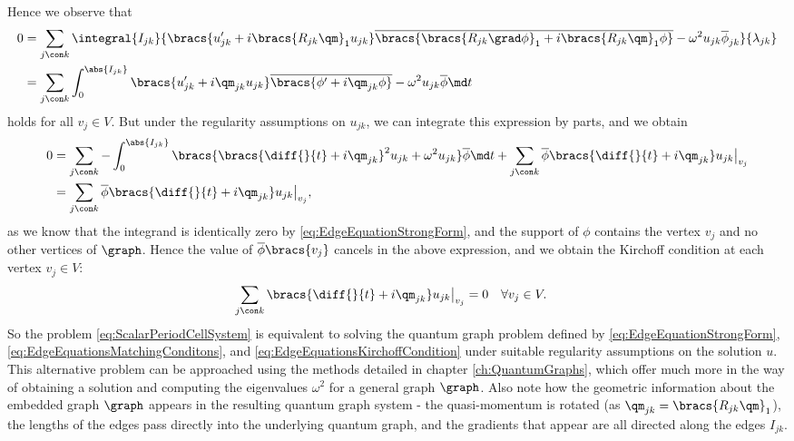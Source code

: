 Hence we observe that
\begin{align*}
	0 &= \sum_{j\con k}\integral{I_{jk}}{\bracs{u_{jk}' + i\bracs{R_{jk}\qm}_1 u_{jk}}\overline{\bracs{\bracs{R_{jk}\grad\phi}_1 + i\bracs{R_{jk}\qm}_1 \phi}} - \omega^2 u_{jk}\overline{\phi}_{jk}}{\lambda_{jk}} \\
	&= \sum_{j\con k}\int_0^{\abs{I_{jk}}} \bracs{ u'_{jk} + i\qm_{jk}u_{jk} } \overline{\bracs{ \phi' + i\qm_{jk}\phi }} - \omega^2 u_{jk}\overline{\phi} \md t
\end{align*}
holds for all $v_j\in V$.
But under the regularity assumptions on $u_{jk}$, we can integrate this expression by parts, and we obtain
\begin{align*}
	0 &= \sum_{j\con k} -\int_0^{\abs{I_{jk}}} \bracs{\bracs{\diff{}{t} + i\qm_{jk}}^2 u_{jk} + \omega^2 u_{jk}}\overline{\phi} \md t 
	+ \sum_{j\con k}\overline{\phi}\bracs{\diff{}{t} + i\qm_{jk}}u_{jk}\big\vert_{v_j} \\
	&= \sum_{j\con k}\overline{\phi}\bracs{\diff{}{t} + i\qm_{jk}}u_{jk}\big\vert_{v_j},
\end{align*}
as we know that the integrand is identically zero by \eqref{eq:EdgeEquationStrongForm}, and the support of $\phi$ contains the vertex $v_j$ and no other vertices of $\graph$.
Hence the value of $\overline{\phi}\bracs{v_j}$ cancels in the above expression, and we obtain the Kirchoff condition at each vertex $v_j\in V$:
\begin{align} \label{eq:EdgeEquationsKirchoffCondition}
	\sum_{j\con k} \bracs{\diff{}{t} + i\qm_{jk}}u_{jk}\big\vert_{v_j} &= 0 \quad \forall v_j\in V.
\end{align}
So the problem \eqref{eq:ScalarPeriodCellSystem} is equivalent to solving the quantum graph problem defined by \eqref{eq:EdgeEquationStrongForm}, \eqref{eq:EdgeEquationsMatchingConditons}, and \eqref{eq:EdgeEquationsKirchoffCondition} under suitable regularity assumptions on the solution $u$.
This alternative problem can be approached using the methods detailed in chapter \ref{ch:QuantumGraphs}, which offer much more in the way of obtaining a solution and computing the eigenvalues $\omega^2$ for a general graph $\graph$.
Also note how the geometric information about the embedded graph $\graph$ appears in the resulting quantum graph system - the quasi-momentum is rotated (as $\qm_{jk} = \bracs{R_{jk}\qm}_1$), the lengths of the edges pass directly into the underlying quantum graph, and the gradients that appear are all directed along the edges $I_{jk}$.

